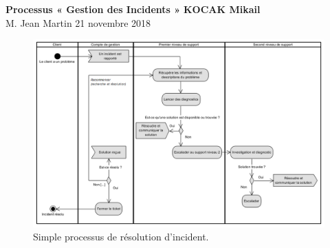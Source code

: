 \documentclass[final, a4paper, 11pt]{article}
\begin{document}
\noindent
\large\textbf{Processus « Gestion des Incidents »} \hfill \textbf{KOCAK Mikail} \\
\normalsize M. Jean Martin \hfill 21 novembre 2018






\newpage

\begin{figure}[!htb]
    \centering
    \includegraphics[width=1.44\linewidth,angle=90]{assets/proc_resolution}
    \caption{Simple processus de résolution d'incident.}
\end{figure}
\end{document}
